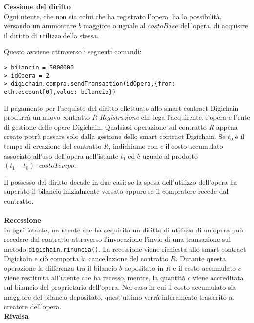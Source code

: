 	\textbf{Cessione del diritto}\\
	
	Ogni utente, che non sia colui che ha registrato l'opera, ha la possibilità, versando un ammontare $b$ maggiore o uguale al $costoBase$ dell'opera, di acquisire il diritto di utilizzo della stessa.

	Questo avviene attraverso i seguenti comandi:
	
\begin{lstlisting}
> bilancio = 5000000
> idOpera = 2
> digichain.compra.sendTransaction(idOpera,{from: eth.account[0],value: bilancio})
\end{lstlisting}

	Il pagamento per l'acquisto del diritto effettuato allo smart contract Digichain produrrà un nuovo contratto $R$ \textit{Registrazione} che lega l'acquirente, l'opera e l'ente di gestione delle opere Digichain. Qualsiasi operazione sul contratto $R$ appena creato potrà passare solo dalla gestione dello smart contract Digichain. 
	Se $t_0$ è il tempo di creazione del contratto $R$, indichiamo con $c$ il costo accumulato associato all'uso dell'opera nell'istante $t_1$ ed è uguale al prodotto $(t_1 - t_0) \cdot costoTempo$.
	
	Il possesso del diritto decade in due casi: se la spesa dell'utilizzo dell'opera ha superato il bilancio inizialmente versato oppure se il compratore recede dal contratto.\\
	\\
	\textbf{Recessione}\\
	
	In ogni istante, un utente che ha acquisito un diritto di utilizzo di un'opera può recedere dal contratto attraverso l'invocazione l'invio di una transazione sul metodo \lstinline|digichain.rinuncia()|. La recessione viene richiesta allo smart contract Digichain e ciò comporta la cancellazione del contratto $R$. Durante questa operazione la differenza tra il bilancio $b$ depositato in $R$ e il costo accumulato $c$ viene restituita all'utente che ha recesso, mentre, la quantità $c$ viene accreditata sul bilancio del proprietario dell'opera. Nel caso in cui il costo accumulato sia maggiore del bilancio depositato, quest'ultimo verrà interamente trasferito al creatore dell'opera.\\
	 
	
	\textbf{Rivalsa}\\
	
